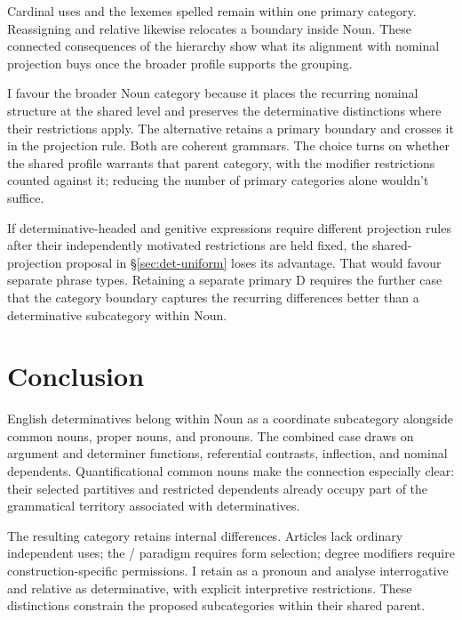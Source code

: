 \documentclass[12pt]{article}
\begin{document}
Cardinal uses and the lexemes spelled  remain within one primary category. Reassigning  and relative  likewise relocates a boundary inside Noun. These connected consequences of the hierarchy show what its alignment with nominal projection buys once the broader profile supports the grouping.

I favour the broader Noun category because it places the recurring nominal structure at the shared level and preserves the determinative distinctions where their restrictions apply. The alternative retains a primary boundary and crosses it in the projection rule. Both are coherent grammars. The choice turns on whether the shared profile warrants that parent category, with the modifier restrictions counted against it; reducing the number of primary categories alone wouldn't suffice.

If determinative-headed and genitive expressions require different projection rules after their independently motivated restrictions are held fixed, the shared-projection proposal in §\ref{sec:det-uniform} loses its advantage. That would favour separate phrase types. Retaining a separate primary D requires the further case that the category boundary captures the recurring differences better than a determinative subcategory within Noun.

\section{Conclusion}\label{sec:conclusion}

English determinatives belong within Noun as a coordinate subcategory alongside common nouns, proper nouns, and pronouns. The combined case draws on argument and determiner functions, referential contrasts, inflection, and nominal dependents. Quantificational common nouns make the connection especially clear: their selected partitives and restricted dependents already occupy part of the grammatical territory associated with determinatives.

The resulting category retains internal differences. Articles lack ordinary independent uses; the /\allowbreak{} paradigm requires form selection; degree modifiers require construction-specific permissions. I retain  as a pronoun and analyse interrogative and relative  as determinative, with explicit interpretive restrictions. These distinctions constrain the proposed subcategories within their shared parent.
\end{document}
